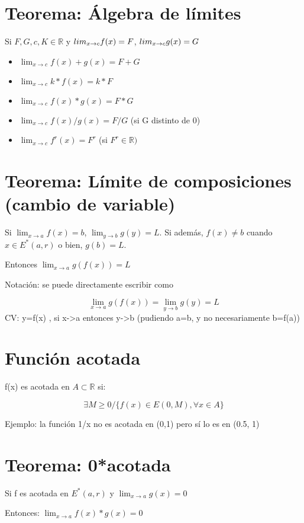 \documentclass{report}
\begin{document}
	\section{Teorema: Álgebra de límites}
		Si $F,G,c,K \in \mathbb{R}$ y $\\lim_{x \to c}f(x)=F$, $\\lim_{x \to c}g(x)=G$
		
		\begin{itemize}
			\item $\lim_{x \to c}f(x) + g(x)=F+G$
			\item $\lim_{x \to c}k*f(x) = k*F$
			\item $\lim_{x \to c}f(x)*g(x)=F*G$
			\item $\lim_{x \to c}f(x)/g(x)=F/G$ (si G distinto de 0)
			\item $\lim_{x \to c}f^r(x) =F^r$ (si $F^r \in \mathbb{R})$
			
		\end{itemize}
	
	\section{Teorema: Límite de composiciones (cambio de variable)}
		Si $\lim_{x \to a}f(x)=b$, $\lim_{y \to b}g(y)=L$. Si además, $f(x) \neq b$ cuando $x \in E^*(a, r)$ o bien, $g(b)=L$.
		
		Entonces $\lim_{x \to a}g(f(x))=L$
		
		Notación: se puede directamente escribir como
		
		$$\lim_{x \to a}g(f(x)) = \lim_{y \to b}g(y) = L$$
		CV: y=f(x) , si x->a entonces y->b (pudiendo a=b, y no necesariamente b=f(a))
		
	\section{Función acotada}
		f(x) es acotada en $A \subset \mathbb{R}$ si:
		
		$$\exists M \geq 0 / \{ f(x) \in E(0,M), \forall x \in A\}$$
		
		Ejemplo: la función 1/x no es acotada en (0,1) pero sí lo es en (0.5, 1)
		
	\section{Teorema: 0*acotada}
		Si f es acotada en $E^*(a,r)$ y $\lim_{x \to a}g(x)=0$
		
		Entonces: $\lim_{x \to a}f(x)*g(x)=0$
		
\end{document}
